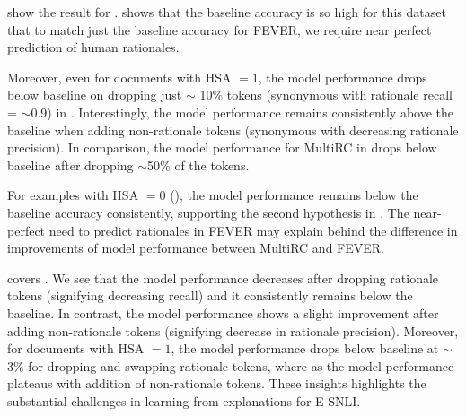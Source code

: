  show the result for \fever.  shows that the baseline accuracy is so high for this dataset that to match just the baseline accuracy for FEVER, we require near perfect prediction of human rationales. 

Moreover, even for documents with HSA $=1$, the model performance drops below baseline on dropping just $\sim$ 10\% tokens (synonymous with rationale recall = $\sim$0.9) in . Interestingly, the model performance remains consistently above the baseline when adding non-rationale tokens (synonymous with decreasing rationale precision). In comparison, the model performance for MultiRC in  drops below baseline after dropping $\sim$50\% of the tokens. 

For \fever examples with HSA $=0$ (), the model performance remains below the baseline accuracy consistently, supporting the second hypothesis in . The near-perfect need to predict rationales in FEVER may explain behind the difference in improvements of model performance between MultiRC and FEVER.

 covers \esnli. We see that the model performance decreases after dropping rationale tokens (signifying decreasing recall) and it consistently remains below the baseline. In contrast, the model performance shows a slight improvement after adding non-rationale tokens (signifying decrease in rationale precision). Moreover, for documents with HSA $=1$, the model performance drops below baseline at $\sim$3\% for dropping and swapping rationale tokens, where as the model performance plateaus with addition of non-rationale tokens. These insights highlights the substantial challenges in learning from explanations for E-SNLI.


